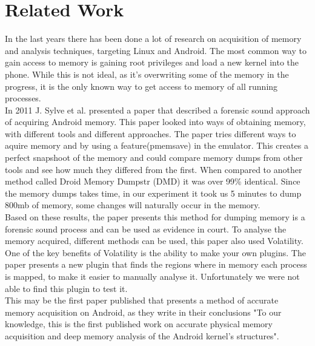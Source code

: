 \section{Related Work}
In the last years there has been done a lot of research on acquisition of memory
and analysis techniques, targeting Linux and Android. The most common way to 
gain access to memory is gaining root privileges and load a new kernel into the 
phone. While this is not ideal, as it’s overwriting some of the memory in the 
progress, it is the only known way to get access to memory of all running processes.\\

In 2011 J. Sylve et al. presented a paper that described a forensic sound 
approach of acquiring Android memory. \cite{acq_vol_android_mem} This paper looked 
into ways of obtaining memory, with different tools and different approaches. The paper 
tries different ways to aquire memory and by using a feature(pmemsave) in the emulator. 
This creates a perfect snapshoot of the memory and could compare memory dumps from other 
tools and see how much they differed from the first. When compared to another method 
called Droid Memory Dumpstr (DMD) it was over 99\% identical. Since the memory dumps 
takes time, in our experiment it took us 5 minutes to dump 800mb of memory, some 
changes will naturally occur in the memory.\\

Based on these results, the paper presents this method for dumping memory is a 
forensic sound process and can be used as evidence in court. To analyse the memory 
acquired, different methods can be used, this paper also used Volatility.
One of the key benefits of Volatility is the ability to make your 
own plugins. The paper presents a new plugin that finds the regions where in memory 
each process is mapped, to make it easier to manually analyse it. Unfortunately we were not 
able to find this plugin to test it.\\

This may be the first paper published that presents a method of accurate memory acquisition on
Android, as they write in their conclusions "To our knowledge, this is the first published work on
accurate physical memory acquisition and deep memory analysis of the Android kernel's structures".
